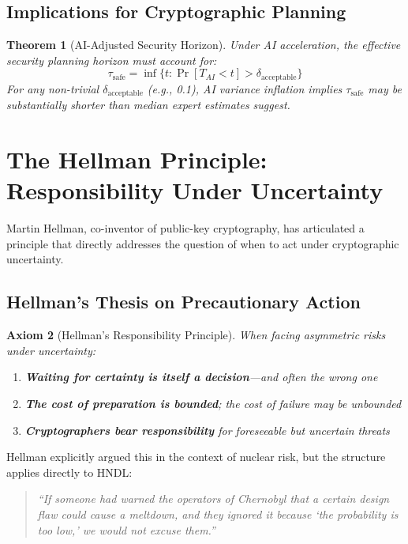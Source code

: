 \documentclass[11pt,a4paper]{article}
\newtheorem{theorem}{Theorem}[section]
\newtheorem{axiom}[theorem]{Axiom}
\begin{document}
\subsection{Implications for Cryptographic Planning}

\begin{theorem}[AI-Adjusted Security Horizon]
Under AI acceleration, the effective security planning horizon must account for:
\begin{equation}
\tau_{\text{safe}} = \inf\{t : \Pr[T_{AI} < t] > \delta_{\text{acceptable}}\}
\end{equation}
For any non-trivial $\delta_{\text{acceptable}}$ (e.g., 0.1), AI variance inflation implies $\tau_{\text{safe}}$ may be substantially shorter than median expert estimates suggest.
\end{theorem}

\section{The Hellman Principle: Responsibility Under Uncertainty}

Martin Hellman, co-inventor of public-key cryptography, has articulated a principle that directly addresses the question of when to act under cryptographic uncertainty.

\subsection{Hellman's Thesis on Precautionary Action}

\begin{axiom}[Hellman's Responsibility Principle]
When facing asymmetric risks under uncertainty:
\begin{enumerate}[noitemsep]
    \item \textbf{Waiting for certainty is itself a decision}---and often the wrong one
    \item \textbf{The cost of preparation is bounded}; the cost of failure may be unbounded
    \item \textbf{Cryptographers bear responsibility} for foreseeable but uncertain threats
\end{enumerate}
\end{axiom}

Hellman explicitly argued this in the context of nuclear risk, but the structure applies directly to HNDL:

\begin{quote}
\textit{``If someone had warned the operators of Chernobyl that a certain design flaw could cause a meltdown, and they ignored it because `the probability is too low,' we would not excuse them.''}
\end{quote}
\end{document}
